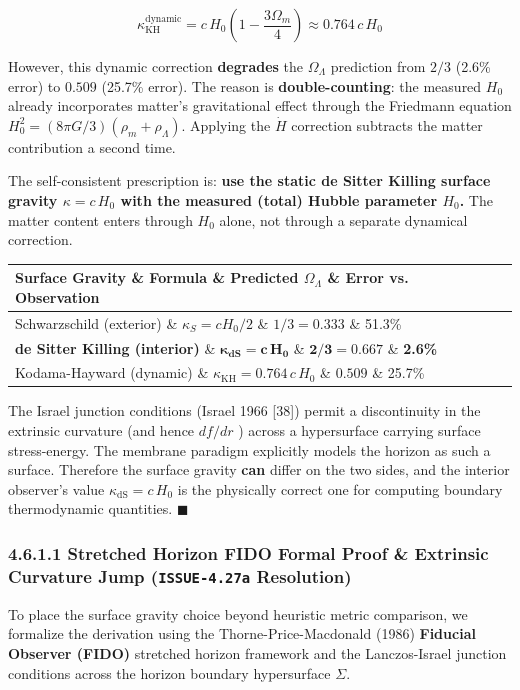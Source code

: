 \documentclass[11pt,a4paper]{article}
\theoremstyle{definition}\newtheorem{definition}{Definition}
\theoremstyle{remark}\newtheorem{remark}{Remark}
\begin{document}
\begin{equation}
\kappa_{\text{KH}}^{\text{dynamic}} = c \, H_0 \left(1 - \frac{3\Omega_m}{4}\right) \approx 0.764 \, c \, H_0
\end{equation}


However, this dynamic correction \textbf{degrades} the $\Omega_\Lambda$ prediction from $2/3$ (2.6\% error) to $0.509$ (25.7\% error). The reason is \textbf{double-counting}: the measured $H_0$ already incorporates matter's gravitational effect through the Friedmann equation $H_0^2 = (8\pi G/3)(\rho_m + \rho_\Lambda)$. Applying the $\dot{H}$ correction subtracts the matter contribution a second time.

The self-consistent prescription is: \textbf{use the static de Sitter Killing surface gravity $\kappa = c \, H_0$ with the measured (total) Hubble parameter $H_0$.} The matter content enters through $H_0$ alone, not through a separate dynamical correction.

\begin{longtable}{llll}
\hline
Surface Gravity \& Formula \& Predicted $\Omega_\Lambda$ \& Error vs. Observation \\
\hline
Schwarzschild (exterior) \& $\kappa_S = c H_0/2$ \& $1/3 = 0.333$ \& 51.3\% \\
\textbf{de Sitter Killing (interior)} \& $\boldsymbol{\kappa_{\text{dS}} = c \, H_0}$ \& $\boldsymbol{2/3 = 0.667}$ \& \textbf{2.6\%} \\
Kodama-Hayward (dynamic) \& $\kappa_{\text{KH}} = 0.764 \, c \, H_0$ \& $0.509$ \& 25.7\% \\
\hline
\end{longtable}
The Israel junction conditions (Israel 1966 [38]) permit a discontinuity in the extrinsic curvature (and hence $df/dr$ ) across a hypersurface carrying surface stress-energy. The membrane paradigm explicitly models the horizon as such a surface. Therefore the surface gravity \textbf{can} differ on the two sides, and the interior observer's value $\kappa_{\text{dS}} = c \, H_0$ is the physically correct one for computing boundary thermodynamic quantities. $\blacksquare$
\subsubsection{4.6.1.1 Stretched Horizon FIDO Formal Proof \& Extrinsic Curvature Jump (\texttt{ISSUE-4.27a} Resolution)}

To place the surface gravity choice beyond heuristic metric comparison, we formalize the derivation using the Thorne-Price-Macdonald (1986) \textbf{Fiducial Observer (FIDO)} stretched horizon framework and the Lanczos-Israel junction conditions across the horizon boundary hypersurface $\Sigma$.
\end{document}
